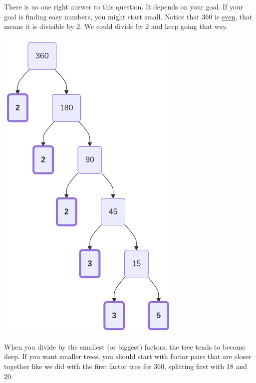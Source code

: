 \documentclass[
  letterpaper,
  DIV=11,
  numbers=noendperiod]{scrreprt}
\begin{document}
\begin{tcolorbox}[enhanced jigsaw, left=2mm, opacityback=0, colback=white, rightrule=.15mm, toptitle=1mm, colframe=quarto-callout-tip-color-frame, leftrule=.75mm, toprule=.15mm, breakable, bottomtitle=1mm, bottomrule=.15mm, colbacktitle=quarto-callout-tip-color!10!white, arc=.35mm, opacitybacktitle=0.6, titlerule=0mm, coltitle=black, title=\textcolor{quarto-callout-tip-color}{\faLightbulb}\hspace{0.5em}{Which factors should I start with?}]

There is no one right answer to this question. It depends on your goal.
If your goal is finding easy numbers, you might start small. Notice that
360 is \href{./glossary.html\#glossary-even}{even}, that means it is
divisible by 2. We could divide by 2 and keep going that way.

\label{mermaid-diagram}
\includegraphics[width=3.51in,height=6.15in]{chapters/Unit_1/1.2_Factors_Multiples_&_Prime_Factorization_files/figure-latex/mermaid-figure-5.png}

When you divide by the smallest (or biggest) factors, the tree tends to
become deep. If you want smaller trees, you should start with factor
pairs that are closer together like we did with the first factor tree
for 360, splitting first with 18 and 20.

\end{tcolorbox}
\end{document}

